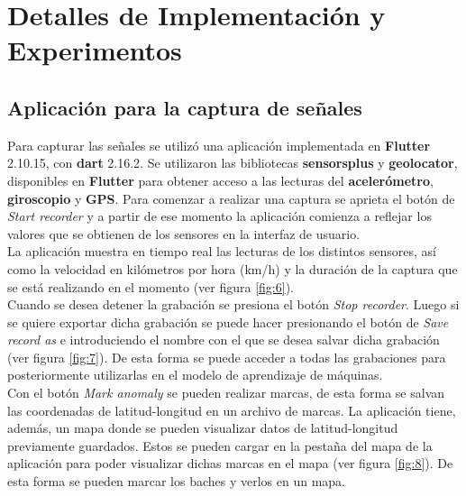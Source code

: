 \chapter{Detalles de Implementación y Experimentos}\label{chapter:implementation}

\section{Aplicación para la captura de señales}
	Para capturar las señales se utilizó una aplicación implementada en \textbf{Flutter} 2.10.15, con \textbf{dart} 2.16.2.
	Se utilizaron las bibliotecas \textbf{sensors\textunderscore plus} y \textbf{geolocator}, disponibles en \textbf{Flutter} para obtener acceso
	a las lecturas del \textbf {acelerómetro}, \textbf{giroscopio} y \textbf{GPS}. Para comenzar a realizar una captura se aprieta el botón
	de \emph{Start recorder} y a partir de ese momento la aplicación comienza a reflejar los valores que se obtienen de los sensores en la
	interfaz de usuario.\\
	\indent La aplicación muestra en tiempo real las lecturas de los distintos sensores, así como la velocidad en kilómetros por hora (km/h) y la
	duración de la captura que se está realizando en el momento (ver figura \ref{fig:6}).\\
	\indent Cuando se desea detener la grabación se presiona el botón \emph{Stop recorder}. Luego si se quiere exportar dicha grabación se puede
	hacer presionando el botón de \emph{Save record as} e introduciendo el nombre con el que se desea salvar dicha grabación (ver figura
	\ref{fig:7}). De esta forma se puede acceder a todas las grabaciones para posteriormente utilizarlas en el modelo de aprendizaje de máquinas.\\
	\indent Con el botón \emph{Mark anomaly} se pueden realizar marcas, de esta forma se salvan las coordenadas de latitud-longitud en un
	archivo de marcas. La aplicación tiene, además, un mapa donde se pueden visualizar datos de latitud-longitud previamente guardados.
	Estos se pueden cargar en la pestaña del mapa de la aplicación para poder visualizar dichas marcas en el mapa (ver figura \ref{fig:8}).
	De esta forma se pueden marcar los baches y verlos en un mapa.\\
	
